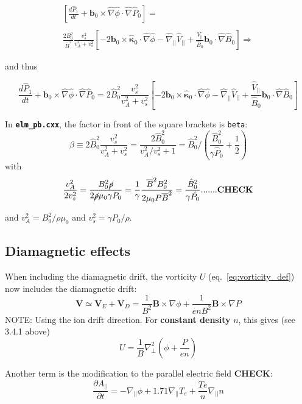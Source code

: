 \documentclass[12pt, a4paper]{article}
\newcommand{\code}[1]{\texttt{#1}}
\newcommand{\file}[1]{\texttt{\bf #1}}
\newcommand{\deriv}[2]{\ensuremath{\frac{\partial #1}{\partial #2}}}
\newcommand{\apar}{\ensuremath{A_{||}}}
\newcommand{\Bbar}{\overline{B}}
\newcommand{\delp}{\nabla_\perp^2}
\begin{document}
\begin{eqnarray*}
\left[ \frac{d\hat{P}_1}{dt} + \mathbf{b}_0\times\hat{\nabla}\hat{\phi}\cdot\hat{\nabla}\hat{P}_0 \right] = \\\\
\frac{2 B_0^2}{\Bbar^2} \frac{v_s^2}{v_A^2 + v_s^2}\left[-2\mathbf{b}_0\times\mathbf{\hat{\kappa}}_0\cdot\hat{\nabla}\hat{\phi} - \hat{\nabla}_{||} \hat{V}_{||} + \frac{\hat{V}_{||}}{\hat{B}_0}\mathbf{b}_0\cdot\hat{\nabla} \hat{B}_0\right]\Rightarrow
\end{eqnarray*}



and thus 

\[
\frac{d\hat{P}_1}{dt} + \mathbf{b}_0\times\hat{\nabla}\hat{\phi}\cdot\hat{\nabla}\hat{P}_0 = 2\hat{B}_0^2 \frac{v_s^2}{v_A^2 + v_s^2}\left[-2\mathbf{b}_0\times\mathbf{\hat{\kappa}}_0\cdot\hat{\nabla}\hat{\phi} - \hat{\nabla}_{||} \hat{V}_{||} + \frac{\hat{V}_{||}}{\hat{B}_0}\mathbf{b}_0\cdot\hat{\nabla} \hat{B}_0\right] 
\]

In \file{elm\_pb.cxx}, the factor in front of the square brackets is \code{beta}:
\[
\beta \equiv 2\hat{B}_0^2 \frac{v_s^2}{v_A^2 + v_s^2} =\frac{ 2\hat{B}_0^2 }{ v_A^2/v_s^2+1}= \hat{B}_0^2 / \left(\frac{\hat{B}_0^2}{\gamma \hat{P}_0} + \frac{1}{2}\right)
\]
with 
\[
\frac{v_A^2}{2 v_s^2}=\frac{B_0^2 \cancel{\rho}}{2 \cancel{\rho} \mu_0 \gamma P_0}=\frac{1}{\gamma}\frac{\Bbar^2 B_0^2}{2 \mu_0 P \Bbar^2}=\frac{\hat{B}_0^2}{\gamma \hat{P_0}} ....... {\bf CHECK}
\]

and $v_A^2=B_0^2/\rho\mu_0$ and $v_s^2=\gamma P_0/\rho$.

\subsection{Diamagnetic effects}

When including the diamagnetic drift, the vorticity $U$ (eq.~\ref{eq:vorticity_def}) now includes the diamagnetic
drift:
\[
\mathbf{V}\simeq \mathbf{V}_E + \mathbf{V}_D = \frac{1}{B^2}\mathbf{B}\times\nabla\phi + \frac{1}{enB^2}\mathbf{B}\times\nabla P
\]
NOTE: Using the ion drift direction. For {\bf constant density} $n$, this gives (see 3.4.1 above)
\begin{equation}
U = \frac{1}{B}\delp\left(\phi + \frac{P}{en}\right)
\label{eq:vorticity_dia}
\end{equation}

Another term is the modification to the parallel electric field {\bf CHECK}:
\[
\deriv{\apar}{t} = -\nabla_{||}\phi + 1.71\nabla_{||} T_e + \frac{Te}{n}\nabla_{||} n
\]
\end{document}
